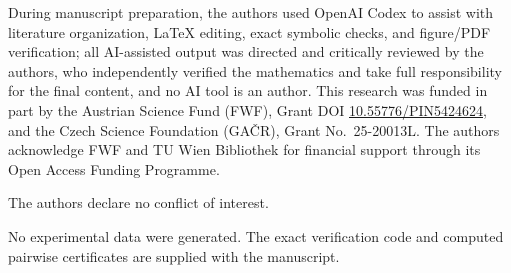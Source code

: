 \documentclass[twocolumn,aps,pra,floatfix,amsmath,amssymb,longbibliography]{revtex4-2}
\theoremstyle{definition}
\theoremstyle{remark}
\begin{document}
\begin{acknowledgments}
During manuscript preparation, the authors used OpenAI Codex to assist with literature organization, LaTeX editing, exact symbolic checks, and figure/PDF verification; all AI-assisted output was directed and critically reviewed by the authors, who independently verified the mathematics and take full responsibility for the final content, and no AI tool is an author.
This research was funded in part by the Austrian
Science Fund (FWF), Grant DOI \href{https://doi.org/10.55776/PIN5424624}{10.55776/PIN5424624}, and the Czech Science
Foundation (GA\v{C}R), Grant No.~25-20013L.
The authors acknowledge FWF and TU Wien Bibliothek for financial support through its Open Access Funding Programme.

The authors declare no conflict of interest.

No experimental data were generated.  The exact verification code and
computed pairwise certificates are supplied with the manuscript.
\end{acknowledgments}
\end{document}
